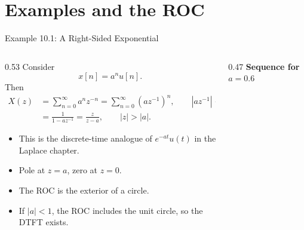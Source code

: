 \section{Examples and the ROC}

\begin{frame}[t]{Example 10.1: A Right-Sided Exponential}
  \small
  \begin{columns}[T]
    \begin{column}{0.53\textwidth}
      Consider
      \[
        x[n]=a^n u[n].
      \]
      Then
      \begin{align*}
        X(z)
        &= \sum_{n=0}^{\infty} a^n z^{-n}
        = \sum_{n=0}^{\infty} (az^{-1})^n, \qquad |az^{-1}|<1 \\
        &= \frac{1}{1-az^{-1}}
        = \frac{z}{z-a},
        \qquad |z|>|a|.
      \end{align*}

      \begin{itemize}
        \item This is the discrete-time analogue of $e^{-at}u(t)$ in the Laplace chapter.
        \item Pole at $z=a$, zero at $z=0$.
        \item The ROC is the exterior of a circle.
        \item If $|a|<1$, the ROC includes the unit circle, so the DTFT exists.
      \end{itemize}
    \end{column}
    \begin{column}{0.47\textwidth}
      \textbf{Sequence for $a=0.6$}\\[-0.05cm]
      \begin{center}
      \end{center}


\end{column}
\end{columns}
\end{frame}
